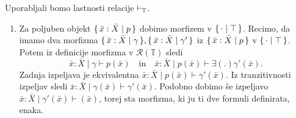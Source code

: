 \documentclass[../kategoricna_logika.tex]{subfiles}
\begin{document}
  \begin{dokaz}
    Uporabljali bomo lastnosti relacije $\vdash_{\mathbb{T}}$.
    \begin{enumerate}[label=(\roman*)]
    \item Za poljuben objekt $\lbrace\,\bar{x}:\bar{X} \mid p\,\rbrace$ dobimo morfizem v
      $\lbrace\,\cdot \mid \top\,\rbrace$.  Recimo, da imamo dva morfizma
      $\lbrace\,\bar{x}:\bar{X} \mid \gamma\,\rbrace, \lbrace\,\bar{x}:\bar{X} \mid \gamma'\,\rbrace$ iz $\lbrace\,\bar{x}:\bar{X} \mid p\,\rbrace$
      v $\lbrace\,\cdot \mid \top\,\rbrace$.  Potem iz definicije morfizma v
      $\mathcal{R}(\mathbb{T})$ sledi
      \[\bar{x}:\bar{X} \mid \gamma \vdash p(\bar{x})\quad \text{in}\quad \bar{x}:\bar{X} \mid
        p(\bar{x}) \vdash \exists (.) \gamma'(\bar{x}).\] Zadnja
      izpeljava je ekvivalentna
      $\bar{x}:\bar{X} \mid p(\bar{x}) \vdash \gamma'(\bar{x})$.  Iz tranzitivnosti
      izpeljav sledi $\bar{x}:\bar{X} \mid \gamma(\bar{x}) \vdash \gamma'(\bar{x})$.
      Podobno dobimo še izpeljavo $\bar{x}:\bar{X} \mid \gamma'(\bar{x}) \vdash(\bar{x}) $, torej
      sta morfizma, ki ju ti dve formuli definirata, enaka.
    

\end{enumerate}
\end{dokaz}
\end{document}
